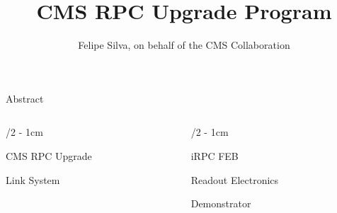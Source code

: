 \documentclass[portrait]{uioposter}
\title{CMS RPC Upgrade Program}
\author
{%
    Felipe Silva, on behalf of the CMS Collaboration
}
\institute
{
   Rio de Janeiro State University - Email: felipe.silva@cern.ch
}
\begin{document}
\begin{frame}


    \begin{block}{Abstract}
        \vskip-1.5cm
        
    \end{block}

\begin{columns}[onlytextwidth]


\begin{column}{\textwidth/2 - 1cm}

    \vskip-2cm
    \begin{block}{CMS RPC Upgrade}
        \vskip-1.5cm
        
    \end{block}

    \vskip-2cm
    \begin{block}{Link System}
        \vskip-1.5cm
        
    \end{block}
\end{column}


\begin{column}{\textwidth/2 - 1cm}
    \vskip-2cm
    \begin{block}{iRPC FEB}
        \vskip-1.5cm
        
    \end{block}

    \vskip-2cm
    \begin{block}{Readout Electronics}
        \vskip-1.5cm
        
    \end{block}

    \vskip-2cm
    \begin{block}{Demonstrator}
        \vskip-1.5cm
        
    \end{block}


\end{column}





\end{columns}
\vskip2cm
\begin{columns}[onlytextwidth]


\end{columns}
\end{frame}
\end{document}

